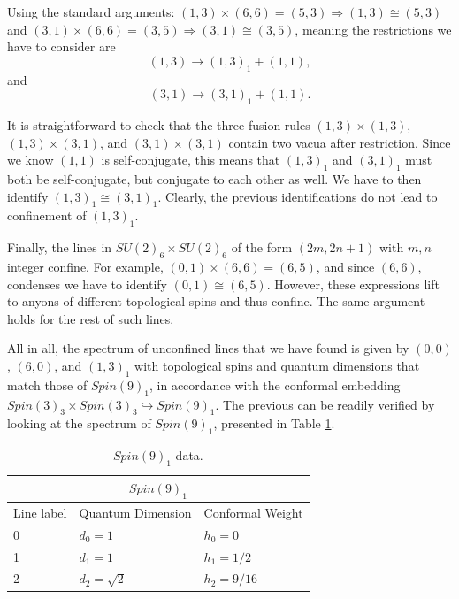\documentclass[11pt]{article}
\numberwithin{equation}{section}
\begin{document}
Using the standard arguments: $(1,3) \times (6,6) = (5,3) \Rightarrow (1,3) \cong (5,3)$ and $(3,1) \times (6,6) = (3,5) \Rightarrow (3,1) \cong (3,5)$, meaning the restrictions we have to consider are
\begin{equation}
    (1,3) \longrightarrow (1,3)_{1} + (1,1),
\end{equation}
and
\begin{equation}
    (3,1) \longrightarrow (3,1)_{1} + (1,1).
\end{equation}

It is straightforward to check that the three fusion rules $(1,3) \times (1,3)$, $(1,3) \times (3,1)$, and $(3,1) \times (3,1)$ contain two vacua after restriction. Since we know $(1,1)$ is self-conjugate, this means that $(1,3)_{1}$ and $(3,1)_{1}$ must both be self-conjugate, but conjugate to each other as well. We have to then identify $(1,3)_{1} \cong (3,1)_{1}$. Clearly, the previous identifications do not lead to confinement of $(1,3)_{1}$.


Finally, the lines in $SU(2)_{6} \times SU(2)_{6}$ of the form $(2m,2n+1)$ with $m,n$ integer confine. For example, $(0,1) \times (6,6) = (6,5)$, and since $(6,6)$, condenses we have to identify $(0,1) \cong (6,5)$. However, these expressions lift to anyons of different topological spins and thus confine. The same argument holds for the rest of such lines.


All in all, the spectrum of unconfined lines that we have found is given by $(0,0)$, $(6,0)$, and $(1,3)_{1}$ with topological spins and quantum dimensions that match those of $Spin(9)_{1}$, in accordance with the conformal embedding $Spin(3)_{3} \times Spin(3)_{3} \hookrightarrow Spin(9)_{1}$. The previous can be readily verified by looking at the spectrum of $Spin(9)_{1}$, presented in Table \ref{spin9lv1table}.  \\


\begin{table}[t]
\centering
\begin{tabular}[h]{|p{4cm}|p{4cm}|p{4cm}| }
\hline 
\multicolumn{3}{|c|}{$Spin(9)_{1}$} \\
\hline
Line label & Quantum Dimension & Conformal Weight \\
\hline
0 & $d_{0} = 1$ & $h_{0}=0$ \\
1 & $d_{1} = 1$ & $h_{1}=1/2$ \\
2 & $d_{2} = \sqrt{2}$ & $h_{2}=9/16$ \\
\hline
\end{tabular}
\caption{$Spin(9)_{1}$ data.}  \label{spin9lv1table}
\end{table}
\end{document}
